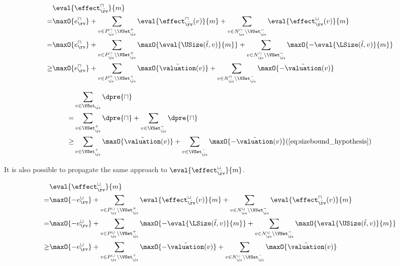 \begin{equation} \label{eq:input_rv_reduction_upper}
  \begin{split}
  & \eval{\effect^\sqcap_{\hat{\rv}}}{m} \\
  = & \maxO{e^{\sqcap}_\rv}
    + \sum_{v \in P_{\hat{\rv}}^\sqcap \setminus \VSet^+_{\hat{\rv}}} \eval{\effect^\sqcap_{\hat{\rv}}(v)}{m}
    + \sum_{v \in N_{\hat{\rv}}^\sqcap \setminus \VSet^-_{\hat{\rv}}} \eval{\effect^\sqcup_{\hat{\rv}}(v)}{m} \\
  = & \maxO{e^{\sqcap}_\rv}
    + \sum_{v \in P_{\hat{\rv}}^\sqcap \setminus \VSet^+_{\hat{\rv}}} \maxO{\eval{\USize(\tilde{t}, v)}{m}}
    + \sum_{v \in N_{\hat{\rv}}^\sqcap \setminus \VSet^-_{\hat{\rv}}} \maxO{-\eval{\LSize(\tilde{t}, v)}{m}} \\
  \geq & \maxO{e^{\sqcap}_\rv}
    + \sum_{v \in P_{\hat{\rv}}^\sqcap \setminus \VSet^+_{\hat{\rv}}} \maxO{\tilde{\valuation}(v)}
    + \sum_{v \in N_{\hat{\rv}}^\sqcap \setminus \VSet^-_{\hat{\rv}}} \maxO{-\tilde{\valuation}(v)} \\
  \end{split}
\end{equation}

\begin{equation} \label{eq:d_upper_reduction}
  \begin{split} 
  & \sum_{v \in \VSet_{\hat{\rv}}} \dpre{\sqcap} \\
  = & \sum_{v \in \VSet^+_{\hat{\rv}}} \dpre{\sqcap} + \sum_{v \in \VSet^-_{\hat{\rv}}} \dpre{\sqcap} \\
  \geq & \sum_{v \in \VSet^+_{\hat{\rv}}} \maxO{\tilde{\valuation}(v)} + \sum_{v \in \VSet^-_{\hat{\rv}}} \maxO{-\tilde{\valuation}(v)} (\ref{eq:sizebound_hypothesis}) \\
  \end{split}      
\end{equation}

It is also possible to propagate the same approach to $\eval{\effect^\sqcup_{\hat{\rv}}}{m}$.

\begin{equation} \label{eq:input_rv_reduction_lower}
  \begin{split}
  & \eval{\effect^\sqcup_{\hat{\rv}}}{m} \\
  = & \maxO{-e^{\sqcup}_\rv}
    + \sum_{v \in P_{\hat{\rv}}^\sqcup \setminus \VSet^+_{\hat{\rv}}} \eval{\effect^\sqcup_{\hat{\rv}}(v)}{m}
    + \sum_{v \in N_{\hat{\rv}}^\sqcup \setminus \VSet^-_{\hat{\rv}}} \eval{\effect^\sqcap_{\hat{\rv}}(v)}{m} \\
  = & \maxO{-e^{\sqcup}_\rv}
    + \sum_{v \in P_{\hat{\rv}}^\sqcup \setminus \VSet^+_{\hat{\rv}}} \maxO{-\eval{\LSize(\tilde{t}, v)}{m}}
    + \sum_{v \in N_{\hat{\rv}}^\sqcup \setminus \VSet^-_{\hat{\rv}}} \maxO{\eval{\USize(\tilde{t}, v)}{m}} \\
  \geq & \maxO{-e^{\sqcup}_\rv}
    + \sum_{v \in P_{\hat{\rv}}^\sqcup \setminus \VSet^+_{\hat{\rv}}} \maxO{-\tilde{\valuation}(v)}
    + \sum_{v \in N_{\hat{\rv}}^\sqcup \setminus \VSet^-_{\hat{\rv}}} \maxO{\tilde{\valuation}(v)} \\
  \end{split}
\end{equation}

